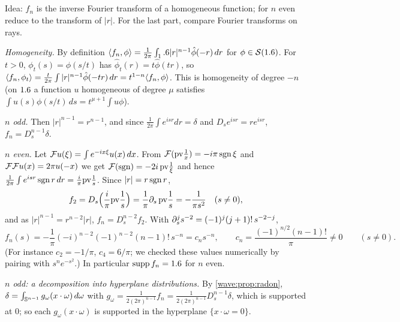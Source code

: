 \subsection*{}
Idea: $f_n$ is the inverse Fourier transform of a homogeneous function; for $n$ even reduce to the
transform of $|r|$. For the last part, compare Fourier transforms on rays.

\emph{Homogeneity.} By definition $\langle f_n, \phi\rangle=\frac1{2\pi}\int_1.6|r|^{n-1}\hat\phi(-r)\,dr$ for $\phi\in\mathcal{S}(1.6)$.
For $t>0$, $\phi_t(s)=\phi(s/t)$ has $\hat\phi_t(r)=t\hat\phi(tr)$, so
$\langle f_n, \phi_t\rangle=\frac t{2\pi}\int|r|^{n-1}\hat\phi(-tr)\,dr=t^{1-n}\langle f_n, \phi\rangle$. This is homogeneity of
degree $-n$ (on $1.6$ a function $u$ homogeneous of degree $\mu$ satisfies
$\int u(s)\phi(s/t)\,ds=t^{\mu+1}\int u\phi$).

\emph{$n$ odd.} Then $|r|^{n-1}=r^{n-1}$, and since $\frac1{2\pi}\int e^{isr}dr=\delta$ and
$D_se^{isr}=re^{isr}$, $f_n=D_s^{n-1}\delta$.

\emph{$n$ even.} Let $\mathcal{F} u(\xi)=\int e^{-ix\xi}u(x)\,dx$. From $\mathcal{F}(\mathrm{pv}\frac1x)=-i\pi\operatorname{sgn}\xi$ and
$\mathcal{F}\mathcal{F} u(x)=2\pi u(-x)$ we get $\mathcal{F}(\operatorname{sgn})=-2i\,\mathrm{pv}\frac1\xi$ and hence
$\frac1{2\pi}\int e^{isr}\operatorname{sgn} r\,dr=\frac i\pi\mathrm{pv}\frac1s$. Since $|r|=r\operatorname{sgn} r$,
\begin{equation*}
  f_2=D_s\Big(\frac i\pi\mathrm{pv}\frac1s\Big)=\frac1\pi\partial_s\,\mathrm{pv}\frac1s=-\frac1{\pi s^2}\quad(s\ne0),
\end{equation*}
and as $|r|^{n-1}=r^{n-2}|r|$, $f_n=D_s^{n-2}f_2$. With $\partial_s^js^{-2}=(-1)^j(j+1)!\,s^{-2-j}$,
\begin{equation*}
  f_n(s)=-\frac1\pi(-i)^{n-2}(-1)^{n-2}(n-1)!\,s^{-n}=c_ns^{-n},\qquad
  c_n=\frac{(-1)^{n/2}(n-1)!}{\pi}\neq0\qquad(s\ne0).
\end{equation*}
(For instance $c_2=-1/\pi$, $c_4=6/\pi$; we checked these values numerically by pairing with
$s^ne^{-s^2}$.) In particular $\operatorname{supp} f_n=1.6$ for $n$ even.

\emph{$n$ odd: a decomposition into hyperplane distributions.} By \cref{wave:prop:radon},
$\delta=\int_{\mathbb{S}^{n-1}}g_\omega(x\cdot\omega)\,d\omega$ with $g_\omega=\frac{1}{2(2\pi)^{n-1}}f_n=\frac{1}{2(2\pi)^{n-1}}D_s^{n-1}\delta$,
which is supported at $0$; so each $g_\omega(x\cdot\omega)$ is supported in the hyperplane $\{x\cdot\omega=0\}$.

